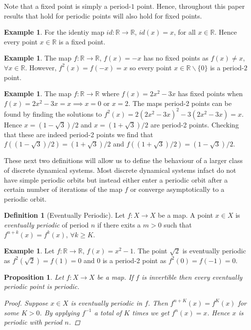\documentclass[11pt,a4paper,oneside]{memoir}
\theoremstyle{plain}
\newtheorem{prop}[thm]{Proposition}
\theoremstyle{definition}
\newtheorem{defn}[thm]{Definition}
\newtheorem{exmp}[thm]{Example}
\begin{document}
Note that a fixed point is simply a period-$1$ point. Hence, throughout this paper results that hold for periodic points will also hold for fixed points.

\begin{exmp}
    For the identiy map $id: \mathbb{R} \to \mathbb{R}$, $id(x) = x$, for all $x \in \mathbb{R}$. Hence every point $x \in \mathbb{R}$ is a fixed point.
\end{exmp}

\begin{exmp}
    The map $f: \mathbb{R} \to \mathbb{R}$, $f(x) = -x$ has no fixed points as $f(x) \neq x$, $\forall x \in \mathbb{R}$. However, $f^2(x) = f(-x) = x$ so every point $x \in \mathbb{R} \backslash \lbrace 0 \rbrace$ is a period-$2$ point.
\end{exmp}

\begin{exmp}
The map $f: \mathbb{R} \to \mathbb{R}$ where $f(x) = 2x^2 - 3x$ has fixed points when $f(x) = 2x^2 - 3x = x \implies x = 0$ or $x = 2$. The maps period-2 points can be found by finding the solutions to $f^2(x) = 2(2x^2 -3x)^2 - 3(2x^2 - 3x) = x$. Hence $x = (1 - \sqrt{3}) / 2$ and $x = (1 + \sqrt{3})/2$ are period-2 points. Checking that these are indeed period-2 points we find that $f((1 - \sqrt{3}) / 2) = (1 + \sqrt{3})/2$ and $f((1 + \sqrt{3})/2) = (1 - \sqrt{3}) / 2$.
\end{exmp}

These next two definitions will allow us to define the behaviour of a larger class of discrete dynamical systems. Most discrete dynamical systems infact do not have simple periodic orbits but instead either enter a periodic orbit after a certain number of iterations of the map $f$ or converge asymptotically to a periodic orbit.

\begin{defn}[Eventually Periodic]
    Let $f: X \to X$ be a map. A point $x \in X$ is \emph{eventually periodic} of period $n$ if there exits a $m > 0$ such that $f^{n+k}(x) = f^k(x)$, $\forall k \geq K$.
\end{defn}

\begin{exmp}
    Let $f: \mathbb{R} \to \mathbb{R}$, $f(x) = x^2 - 1$. The point $\sqrt{2}$ is eventually periodic as $f^2(\sqrt{2}) = f(1) = 0$ and $0$ is a period-2 point as $f^2(0) = f(-1) = 0$.
\end{exmp}

\begin{prop}
    Let $f: X \to X$ be a map. If $f$ is invertible then every eventually periodic point is periodic.
    \begin{proof}
        Suppose $x \in X$ is eventually periodic in $f$. Then $f^{n+K}(x) = f^K(x)$ for some $K > 0$. By applying $f^{-1}$ a total of $K$ times we get $f^n(x) = x$. Hence $x$ is periodic with period $n$.
    \end{proof}
\end{prop}
\end{document}
